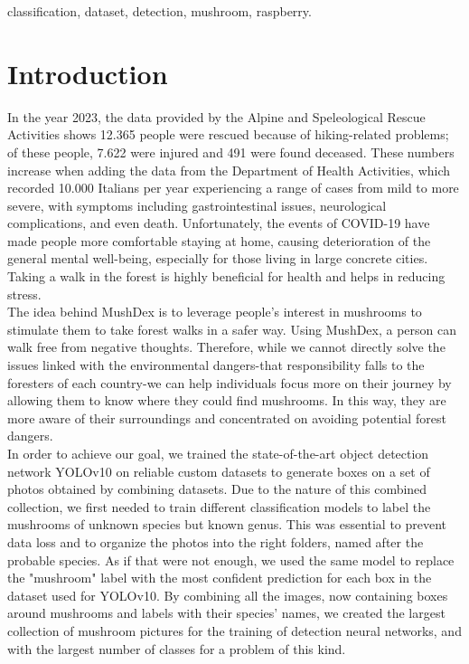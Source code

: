 \documentclass[conference]{IEEEtran}
\begin{document}
\begin{IEEEkeywords}
classification, dataset, detection, mushroom, raspberry.
\end{IEEEkeywords}

\section{Introduction}
In the year 2023, the data provided by the Alpine and Speleological Rescue Activities shows 12.365 people were rescued because of hiking-related problems; of these people, 7.622 were injured and 491 were found deceased\cite{CNSAS}. These numbers increase when adding the data from the Department of Health Activities, which recorded 10.000 Italians per year experiencing a range of cases from mild to more severe, with symptoms including gastrointestinal issues, neurological complications, and even death. Unfortunately, the events of COVID-19 have made people more comfortable staying at home, causing deterioration of the general mental well-being, especially for those living in large concrete cities. Taking a walk in the forest is highly beneficial for health and helps in reducing stress.\\
The idea behind MushDex is to leverage people's interest in mushrooms to stimulate them to take forest walks in a safer way. Using MushDex, a person can walk free from negative thoughts. Therefore, while we cannot directly solve the issues linked with the environmental dangers-that responsibility falls to the foresters of each country-we can help individuals focus more on their journey by allowing them to know where they could find mushrooms. In this way, they are more aware of their surroundings and concentrated on avoiding potential forest dangers.\\
In order to achieve our goal, we trained the state-of-the-art object detection network YOLOv10\cite{wang2024yolov10} on reliable custom datasets to generate boxes on a set of photos obtained by combining datasets. Due to the nature of this combined collection, we first needed to train different classification models to label the mushrooms of unknown species but known genus. This was essential to prevent data loss and to organize the photos into the right folders, named after the probable species. As if that were not enough, we used the same model to replace the "mushroom" label with the most confident prediction for each box in the dataset used for YOLOv10. By combining all the images, now containing boxes around mushrooms and labels with their species' names, we created the largest collection of mushroom pictures for the training of detection neural networks, and with the largest number of classes for a problem of this kind.\\
\end{document}
